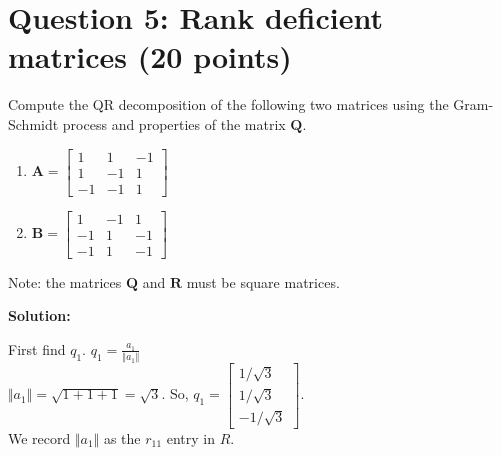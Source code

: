 \documentclass[11pt]{article}
\begin{document}
\newpage
\section*{Question 5: Rank deficient matrices (20 points)}

Compute the QR decomposition of the following two matrices using the Gram-Schmidt process and properties of the matrix $\mathbf{Q}$.
\begin{enumerate}
    \item[(i)] $\mathbf{A} = \begin{bmatrix}
        1 & 1 & -1\\
        1 & -1 & 1\\
        -1 & -1 & 1
    \end{bmatrix}$
    \item[(ii)] $\mathbf{B} = \begin{bmatrix}
        1 & -1 & 1\\
        -1 & 1 & -1\\
        -1 & 1 & -1
    \end{bmatrix}$
\end{enumerate}
Note: the matrices $\mathbf{Q}$ and $\mathbf{R}$ must be square matrices.

\textbf{Solution:}
\bigskip


\noindent First find $q_1$. \quad $q_1 = \frac{a_1}{\Vert a_1 \Vert}$\\
$\Vert a_1 \Vert = \sqrt{1 + 1 + 1} = \sqrt3$. So, $q_1 = \begin{bmatrix}
    1/\sqrt3\\1/\sqrt3\\-1/\sqrt3
\end{bmatrix}$.\\
We record $\Vert a_1 \Vert$ as the $r_{11}$ entry in $R$.\\
\medskip
\end{document}
